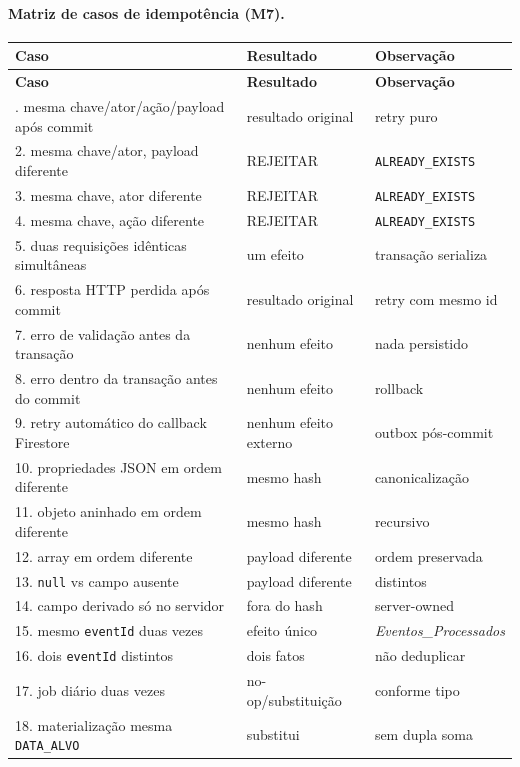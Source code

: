 \paragraph{Matriz de casos de idempotência (M7).}
\begin{longtable}{p{}p{}p{}}
\toprule
\textbf{Caso} & \textbf{Resultado} & \textbf{Observação} \\
\midrule
\endfirsthead
\toprule
\textbf{Caso} & \textbf{Resultado} & \textbf{Observação} \\
\midrule
\endhead
\bottomrule
\endfoot
1. mesma chave/ator/ação/payload após commit & resultado original & retry puro \\
2. mesma chave/ator, payload diferente & REJEITAR & \texttt{ALREADY\_EXISTS} \\
3. mesma chave, ator diferente & REJEITAR & \texttt{ALREADY\_EXISTS} \\
4. mesma chave, ação diferente & REJEITAR & \texttt{ALREADY\_EXISTS} \\
5. duas requisições idênticas simultâneas & um efeito & transação serializa \\
6. resposta HTTP perdida após commit & resultado original & retry com mesmo id \\
7. erro de validação antes da transação & nenhum efeito & nada persistido \\
8. erro dentro da transação antes do commit & nenhum efeito & rollback \\
9. retry automático do callback Firestore & nenhum efeito externo & outbox pós-commit \\
10. propriedades JSON em ordem diferente & mesmo hash & canonicalização \\
11. objeto aninhado em ordem diferente & mesmo hash & recursivo \\
12. array em ordem diferente & payload diferente & ordem preservada \\
13. \texttt{null} vs campo ausente & payload diferente & distintos \\
14. campo derivado só no servidor & fora do hash & server-owned \\
15. mesmo \texttt{eventId} duas vezes & efeito único & \textit{Eventos\_Processados} \\
16. dois \texttt{eventId} distintos & dois fatos & não deduplicar \\
17. job diário duas vezes & no-op/substituição & conforme tipo \\
18. materialização mesma \texttt{DATA\_ALVO} & substitui & sem dupla soma \\

\end{longtable}
